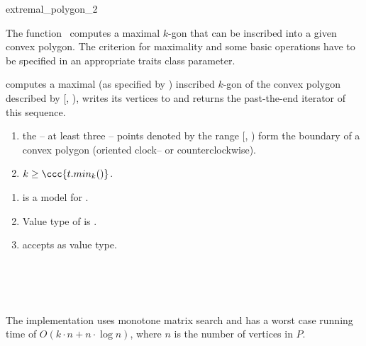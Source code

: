 \begin{ccRefFunction}{extremal_polygon_2}
  \begin{ccAdvanced}
  
    \ccDefinition The function \ccRefName\ computes a maximal $k$-gon
    that can be inscribed into a given convex polygon. The criterion
    for maximality and some basic operations have to be specified in
    an appropriate traits class parameter.
    

    \def\ccLongParamLayout{\ccTrue} 
    
    
    computes a maximal (as specified by ) inscribed $k$-gon of
    the convex polygon described by [,
    ), writes its vertices to  and returns the
    past-the-end iterator of this sequence.
    
    \ccPrecond
    \begin{enumerate}
    \item the -- at least three -- points denoted by the range
      [, ) form the boundary of a
      convex polygon (oriented clock-- or counterclockwise).
    \item $k \ge \ccc{t.min_k()}$.
    \end{enumerate}
    
    \ccRequire
    \begin{enumerate}
    \item {} is a model for .
    \item Value type of  is .
    \item {} accepts  as value
      type.
    \end{enumerate}

    \ccSeeAlso
    \\
    \\
    \\
  
    \ccImplementation The implementation uses monotone matrix search
    \cite{akmsw-gamsa-87} and has a worst case running time of $O(k
    \cdot n + n \cdot \log n)$, where $n$ is the number of vertices in
    $P$.
  \end{ccAdvanced}
\end{ccRefFunction}

